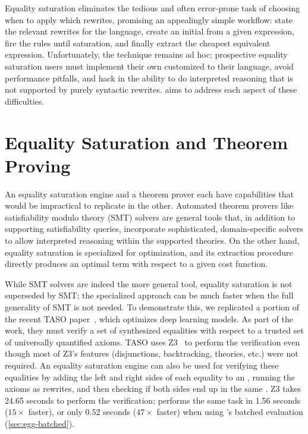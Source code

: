 Equality saturation eliminates the tedious and often error-prone
  task of choosing when to apply which rewrites,
  promising an appealingly simple workflow: state the
  relevant rewrites for the language, create an initial \egraph from a given
  expression, fire the rules until saturation,
  and finally extract the cheapest equivalent expression.
Unfortunately, the technique remains ad hoc; prospective equality saturation
  users must implement their own \egraphs customized to their language, avoid
  performance pitfalls, and hack in the ability to do interpreted reasoning
  that is not supported by purely syntactic rewrites.
\egg aims to address each aspect of these difficulties.

\section{Equality Saturation and Theorem Proving}

An equality saturation engine and a theorem prover each have capabilities that
  would be impractical to replicate in the other.
Automated theorem provers like satisfiability modulo theory (SMT) solvers are
  general tools that, in addition to supporting satisfiability queries,
  incorporate sophisticated, domain-specific solvers to allow interpreted
  reasoning within the supported theories.
On the other hand, equality saturation is specialized for optimization, and its
  extraction procedure directly produces an optimal term with respect to a given
  cost function.


While SMT solvers are indeed the more general tool,
  equality saturation is not superseded by SMT;
  the specialized approach can be much faster when the full generality of SMT is
  not needed.
To demonstrate this, we replicated a portion of the recent TASO paper~\cite{taso},
  which optimizes deep learning models.
As part of the work, they must verify a set of synthesized equalities with
  respect to a trusted set of universally quantified axioms.
TASO uses Z3~\cite{z3} to perform the
  verification even though most of Z3's features
  (disjunctions, backtracking, theories, etc.)
  were not required.
An equality saturation engine can also be used for verifying these equalities
  by adding the left and right sides of
  each equality to an \egraph,
  running the axioms as rewrites,
  and then checking if both sides end up in the same \eclass.
Z3 takes 24.65 seconds to perform the verification;
  \egg performs the same task in 1.56 seconds ($15\times$ faster),
  or only 0.52 seconds ($47\times$ faster) when using
  \egg's batched evaluation (\autoref{sec:egg-batched}).

